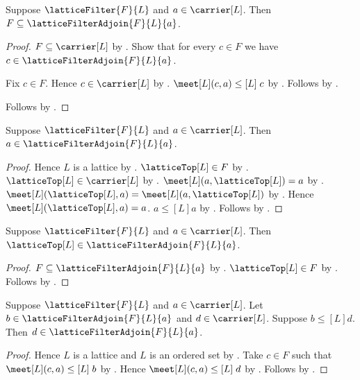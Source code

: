 \begin{proposition}\label{lattice_filter_adjoin_contains_filter}
    Suppose $\latticeFilter{F}{L}$ and $a\in\carrier[L]$.
    Then $F\subseteq\latticeFilterAdjoin{F}{L}{a}$.
\end{proposition}
\begin{proof}
    $F\subseteq\carrier[L]$ by
        .
    Show that for every $c\in F$ we have
        $c\in\latticeFilterAdjoin{F}{L}{a}$.
    \begin{subproof}
        Fix $c\in F$.
        Hence $c\in\carrier[L]$ by .
        $\meet[L](c,a)\mathrel{\leq[L]}c$ by .
        Follows by .
    \end{subproof}
    Follows by .
\end{proof}

\begin{proposition}\label{lattice_filter_adjoin_contains_element}
    Suppose $\latticeFilter{F}{L}$ and $a\in\carrier[L]$.
    Then $a\in\latticeFilterAdjoin{F}{L}{a}$.
\end{proposition}
\begin{proof}
    Hence $L$ is a lattice by .
    $\latticeTop[L]\in F$ by .
    $\latticeTop[L]\in\carrier[L]$ by .
    $\meet[L](a,\latticeTop[L])=a$ by .
    $\meet[L](\latticeTop[L],a)
        =\meet[L](a,\latticeTop[L])$ by
        .
    Hence $\meet[L](\latticeTop[L],a)=a$.
    $a\mathrel{\leq[L]}a$ by
        .
    Follows by .
\end{proof}

\begin{proposition}\label{lattice_filter_adjoin_top}
    Suppose $\latticeFilter{F}{L}$ and $a\in\carrier[L]$.
    Then $\latticeTop[L]\in\latticeFilterAdjoin{F}{L}{a}$.
\end{proposition}
\begin{proof}
    $F\subseteq\latticeFilterAdjoin{F}{L}{a}$ by
        .
    $\latticeTop[L]\in F$ by .
    Follows by .
\end{proof}

\begin{proposition}\label{lattice_filter_adjoin_upward}
    Suppose $\latticeFilter{F}{L}$ and $a\in\carrier[L]$.
    Let $b\in\latticeFilterAdjoin{F}{L}{a}$ and
        $d\in\carrier[L]$.
    Suppose $b\mathrel{\leq[L]}d$.
    Then $d\in\latticeFilterAdjoin{F}{L}{a}$.
\end{proposition}
\begin{proof}
    Hence $L$ is a lattice and $L$ is an ordered set by
        .
    Take $c\in F$ such that
        $\meet[L](c,a)\mathrel{\leq[L]}b$ by
        .
    Hence $\meet[L](c,a)\mathrel{\leq[L]}d$ by
        .
    Follows by .
\end{proof}


